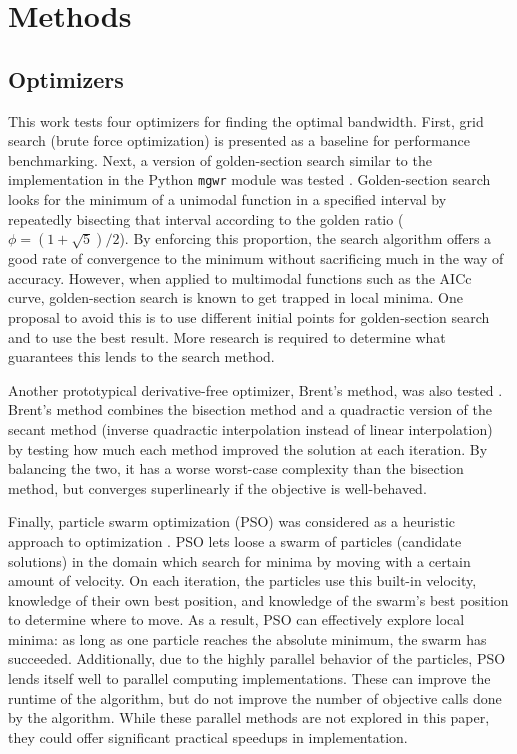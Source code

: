 \documentclass[letterpaper,12pt,twocolumn]{article}
\begin{document}
\section{Methods}
\label{sec:methods}
\subsection{Optimizers}
This work tests four optimizers for finding the optimal bandwidth. First, grid search (brute force optimization) is presented as a baseline for performance benchmarking. Next, a version of golden-section search \cite{Kiefer1953} similar to the implementation in the Python \texttt{mgwr} module was tested \cite{Oshan2019}. Golden-section search looks for the minimum of a unimodal function in a specified interval by repeatedly bisecting that interval according to the golden ratio ($\phi = (1 + \sqrt{5})/2$). By enforcing this proportion, the search algorithm offers a good rate of convergence to the minimum without sacrificing much in the way of accuracy. However, when applied to multimodal functions such as the AICc curve, golden-section search is known to get trapped in local minima. One proposal to avoid this is to use different initial points for golden-section search and to use the best result. More research is required to determine what guarantees this lends to the search method.

Another prototypical derivative-free optimizer, Brent's method, was also tested \cite{Brent1973}. Brent's method combines the bisection method and a quadractic version of the secant method (inverse quadractic interpolation instead of linear interpolation) by testing how much each method improved the solution at each iteration. By balancing the two, it has a worse worst-case complexity than the bisection method, but converges superlinearly if the objective is well-behaved.

Finally, particle swarm optimization (PSO) was considered as a heuristic approach to optimization \cite{Bonyadi2017}. PSO lets loose a swarm of particles (candidate solutions) in the domain which search for minima by moving with a certain amount of velocity. On each iteration, the particles use this built-in velocity, knowledge of their own best position, and knowledge of the swarm's best position to determine where to move. As a result, PSO can effectively explore local minima: as long as one particle reaches the absolute minimum, the swarm has succeeded. Additionally, due to the highly parallel behavior of the particles, PSO lends itself well to parallel computing implementations. These can improve the runtime of the algorithm, but do not improve the number of objective calls done by the algorithm. While these parallel methods are not explored in this paper, they could offer significant practical speedups in implementation.
\end{document}
